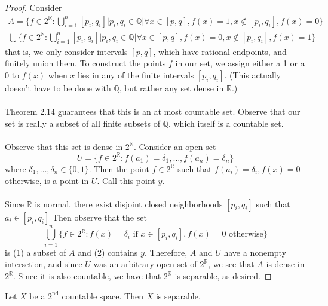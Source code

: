 \documentclass[a4paper,12pt,twoside]{hmcpset}
\begin{document}
\begin{proof}
    Consider 
    \begin{align*}
        A = \Big\{f \in 2^\mathbb{R}: \bigcup_{i = 1}^n [p_i, q_i] | p_i, q_i \in \mathbb{Q} \Big| \forall x \in [p, q], f(x) = 1, x \notin [p_i, q_i], f(x) = 0\}\\
        \bigcup  \Big\{f \in 2^\mathbb{R}: \bigcup_{i = 1}^n [p_i, q_i] | p_i, q_i \in \mathbb{Q} \Big| \forall x \in [p, q], f(x) = 0, x \notin [p_i, q_i], f(x) = 1\}
    \end{align*}
    that is, we only consider intervals $[p, q]$, which have rational
    endpoints, and finitely union them. 
    To construct the points $f$ in our set, we assign either a 1 or a 0
    to $f(x)$ when $x$ lies in any of the finite intervals $[p_i,
    q_i]$. (This actually doesn't
    have to be done with $\mathbb{Q}$, but rather any set dense in
    $\mathbb{R}$.) 
    \\
    \\
    Theorem 2.14 guarantees that this is an at most countable
    set. Observe that our set is really a subset of all finite subsets
    of $\mathbb{Q}$, which itself is a countable set.
    \\
    \\
    Observe that this set is dense in $2^\mathbb{R}$. Consider an open set 
    \[
        U = \{f \in 2^\mathbb{R} : f(a_1) = \delta_1, \dots , f(a_n) = \delta_n\}
    \]
    where $\delta_1, \dots, \delta_n \in \{0, 1\}$. Then the point $f
    \in 2^\mathbb{R}$ such that $f(a_i) = \delta_i, f(x) = 0$
    otherwise, is a point in $U$. Call this point $y$.
    \\
    \\   
    Since $\mathbb{R}$
    is normal, there exist
    disjoint closed neighborhoods $[p_i, q_i]$ 
    such that $a_i \in [p_i, q_i]$ Then observe that the set 
    \[
        \bigcup_{i = 1}^n\{f \in 2^\mathbb{R} : f(x) = \delta_i \text{ if } x \in [p_i, q_i], f(x) = 0 \text{ otherwise}  \}  
    \] 
    is (1) a subset of $A$ and (2) contains $y$. Therefore, $A$ and
    $U$ have a nonempty intersetion, and since $U$ was an arbitrary
    open set of $2^\mathbb{R}$, we see that $A$ is dense in
    $2^\mathbb{R}$. Since it is also countable, we have that
    $2^\mathbb{R}$ is separable, as desired.
\end{proof}

\begin{problem}[Theorem 6.9]
    Let $X$ be a $2^{\text{nd}}$ countable space. Then $X$ is separable.
\end{problem}
\end{document}
